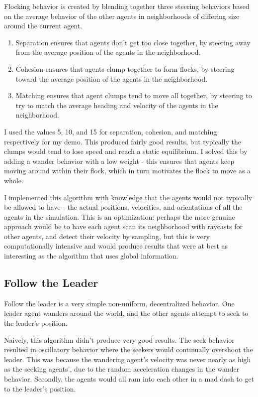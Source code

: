 \documentclass{article}
\begin{document}
Flocking behavior is created by blending together three steering behaviors based
on the average behavior of the other agents in neighborhoods of differing size
around the current agent.
\begin{enumerate}
\item Separation ensures that agents don't get too close together, by steering
away from the average position of the agents in the neighborhood.
\item Cohesion ensures that agents clump together to form flocks, by steering
toward the average position of the agents in the neighborhood.
\item Matching ensures that agent clumps tend to move all together, by steering
to try to match the average heading and velocity of the agents in the
neighborhood.
\end {enumerate}

I used the values 5, 10, and 15 for separation, cohesion, and matching
respectively for my demo. This produced fairly good results, but typically the
clumps would tend to lose speed and reach a static equilibrium. I solved this
by adding a wander behavior with a low weight - this ensures that agents keep
moving around within their flock, which in turn motivates the flock to move as
a whole.

I implemented this algorithm with knowledge that the agents would not typically
be allowed to have - the actual positions, velocities, and orientations of all
the agents in the simulation. This is an optimization: perhaps the more
genuine approach would be to have each agent scan its neighborhood with raycasts
for other agents, and detect their velocity by sampling, but this is
very computationally intensive and would produce results that were at best as
interesting as the algorithm that uses global information.

\subsection {Follow the Leader}
Follow the leader is a very simple non-uniform, decentralized behavior. One
leader agent wanders around the world, and the other agents attempt to seek to
the leader's position.

Naively, this algorithm didn't produce very good results. The seek behavior
resulted in oscillatory behavior where the seekers would continually overshoot
the leader. This was because the wandering agent's velocity was never nearly
as high as the seeking agents', due to the random acceleration changes in
the wander behavior. Secondly, the agents would all ram into each other in a
mad dash to get to the leader's position.
\end{document}
